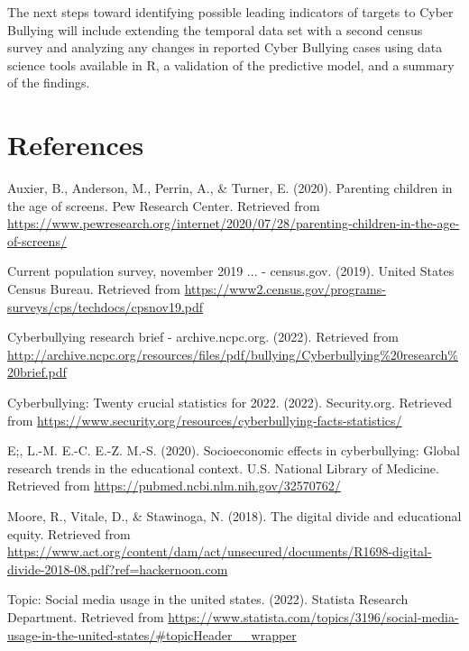 \documentclass[
  man,LLO-8200, Introduction to Data Science]{apa6}
\newlength{\cslhangindent}
\newlength{\cslentryspacingunit} %
\newenvironment{CSLReferences}[2] %
 {%
  \setlength{\parindent}{0pt}
  \ifodd #1
  \let\oldpar\par
  \def\par{\hangindent=\cslhangindent\oldpar}
  \fi
  \setlength{\parskip}{#2\cslentryspacingunit}
 }%
 {}
\begin{document}
The next steps toward identifying possible leading indicators of targets to Cyber Bullying will include extending the temporal data set with a second census survey and analyzing any changes in reported Cyber Bullying cases using data science tools available in R, a validation of the predictive model, and a summary of the findings.

\newpage

\hypertarget{references}{%
\section*{References}\label{references}}

\hypertarget{refs}{}
\begin{CSLReferences}{1}{0}
\leavevmode{}%
Auxier, B., Anderson, M., Perrin, A., \& Turner, E. (2020). Parenting children in the age of screens. Pew Research Center. Retrieved from \url{https://www.pewresearch.org/internet/2020/07/28/parenting-children-in-the-age-of-screens/}

\leavevmode{}%
Current population survey, november 2019 ... - census.gov. (2019). United States Census Bureau. Retrieved from \url{https://www2.census.gov/programs-surveys/cps/techdocs/cpsnov19.pdf}

\leavevmode{}%
Cyberbullying research brief - archive.ncpc.org. (2022). Retrieved from \url{http://archive.ncpc.org/resources/files/pdf/bullying/Cyberbullying\%20research\%20brief.pdf}

\leavevmode{}%
Cyberbullying: Twenty crucial statistics for 2022. (2022). Security.org. Retrieved from \url{https://www.security.org/resources/cyberbullying-facts-statistics/}

\leavevmode{}%
E;, L.-M. E.-C. E.-Z. M.-S. (2020). Socioeconomic effects in cyberbullying: Global research trends in the educational context. U.S. National Library of Medicine. Retrieved from \url{https://pubmed.ncbi.nlm.nih.gov/32570762/}

\leavevmode{}%
Moore, R., Vitale, D., \& Stawinoga, N. (2018). The digital divide and educational equity. Retrieved from \url{https://www.act.org/content/dam/act/unsecured/documents/R1698-digital-divide-2018-08.pdf?ref=hackernoon.com}

\leavevmode{}%
Topic: Social media usage in the united states. (2022). Statista Research Department. Retrieved from \url{https://www.statista.com/topics/3196/social-media-usage-in-the-united-states/\#topicHeader__wrapper}

\end{CSLReferences}
\end{document}
